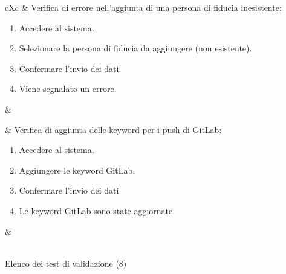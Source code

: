 \begin{table}[H]
\begin{VTtable}[1.7]{\textwidth}{cXc}
        \addtotv & Verifica di errore nell'aggiunta di una persona di fiducia inesistente:
		\begin{enumerate}
			\item Accedere al sistema.
            \item Selezionare la persona di fiducia da aggiungere (non esistente).
            \item Confermare l'invio dei dati.
            \item Viene segnalato un errore.
		\end{enumerate}
		& \TNI \\\midrule
        
        \addtotv & Verifica di aggiunta delle keyword per i push di GitLab:
		\begin{enumerate}
			\item Accedere al sistema.
            \item Aggiungere le keyword GitLab.
            \item Confermare l'invio dei dati.
            \item Le keyword GitLab sono state aggiornate.
		\end{enumerate}
		& \TNI \\
        \bottomrule\\
        \end{VTtable}
	\caption{Elenco dei test di validazione (8)}
\end{table}
